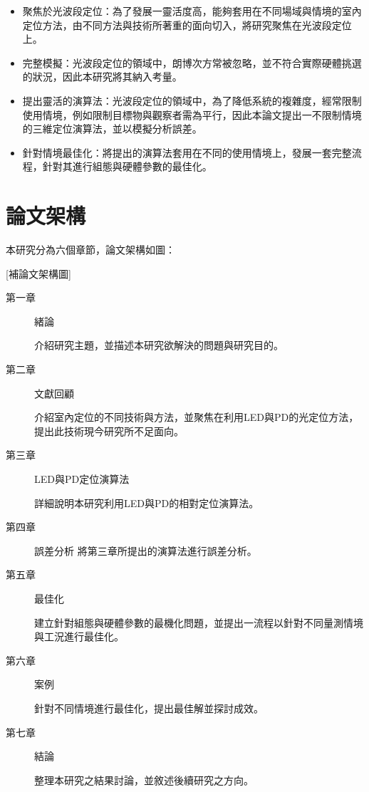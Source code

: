 


\begin{itemize} 
    \item{聚焦於光波段定位}：為了發展一靈活度高，能夠套用在不同場域與情境的室內定位方法，由不同方法與技術所著重的面向切入，將研究聚焦在光波段定位上。
    \item{完整模擬}：光波段定位的領域中，朗博次方常被忽略，並不符合實際硬體挑選的狀況，因此本研究將其納入考量。
    \item{提出靈活的演算法}：光波段定位的領域中，為了降低系統的複雜度，經常限制使用情境，例如限制目標物與觀察者需為平行，因此本論文提出一不限制情境的三維定位演算法，並以模擬分析誤差。
    \item{針對情境最佳化}：將提出的演算法套用在不同的使用情境上，發展一套完整流程，針對其進行組態與硬體參數的最佳化。
\end{itemize}









\section{論文架構}
本研究分為六個章節，論文架構如圖：

[補論文架構圖]

\begin{description}
    \item[第一章] 緒論
    
    介紹研究主題，並描述本研究欲解決的問題與研究目的。
    
    \item[第二章] 文獻回顧
    
    介紹室內定位的不同技術與方法，並聚焦在利用LED與PD的光定位方法，提出此技術現今研究所不足面向。
    
    \item[第三章] LED與PD定位演算法
    
    詳細說明本研究利用LED與PD的相對定位演算法。

    \item[第四章] 誤差分析
    將第三章所提出的演算法進行誤差分析。
    
    \item[第五章] 最佳化
    
    建立針對組態與硬體參數的最機化問題，並提出一流程以針對不同量測情境與工況進行最佳化。
    
    \item[第六章] 案例
    
    針對不同情境進行最佳化，提出最佳解並探討成效。
    
    \item[第七章] 結論
    
    整理本研究之結果討論，並敘述後續研究之方向。
    
    \end{description}







